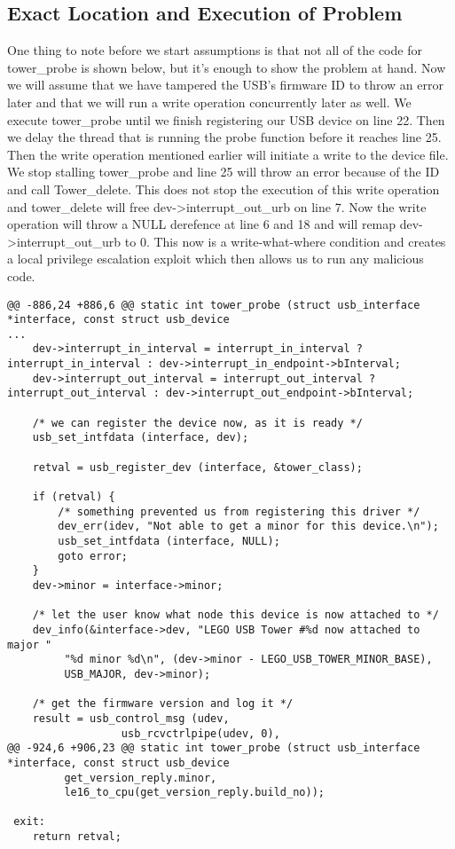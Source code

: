\documentclass{article}
\begin{document}
\subsection{Exact Location and Execution of Problem}
One thing to note before we start assumptions is that not all of the code for tower\_probe is shown below, but it's enough to show the problem at hand. Now we will assume that we have tampered the USB's firmware ID to throw an error later and that we will run a write operation concurrently later as well. We execute tower\_probe until we finish registering our USB device on line 22. Then we delay the thread that is running the probe function before it reaches line 25. Then the write operation mentioned earlier will initiate a write to the device file. We stop stalling tower\_probe and line 25 will throw an error because of the ID and call Tower\_delete. This does not stop the execution of this write operation and tower\_delete will free dev->interrupt\_out\_urb on line 7. Now the write operation will throw a NULL derefence at line 6 and 18 and will remap dev->interrupt\_out\_urb to 0. This now is a write-what-where condition and creates a local privilege escalation exploit which then allows us to run any malicious code.
\begin{lstlisting}[style=CStyle]
@@ -886,24 +886,6 @@ static int tower_probe (struct usb_interface *interface, const struct usb_device
...
 	dev->interrupt_in_interval = interrupt_in_interval ? interrupt_in_interval : dev->interrupt_in_endpoint->bInterval;
 	dev->interrupt_out_interval = interrupt_out_interval ? interrupt_out_interval : dev->interrupt_out_endpoint->bInterval;
 
	/* we can register the device now, as it is ready */
	usb_set_intfdata (interface, dev);

	retval = usb_register_dev (interface, &tower_class);

	if (retval) {
		/* something prevented us from registering this driver */
		dev_err(idev, "Not able to get a minor for this device.\n");
		usb_set_intfdata (interface, NULL);
		goto error;
	}
	dev->minor = interface->minor;

	/* let the user know what node this device is now attached to */
	dev_info(&interface->dev, "LEGO USB Tower #%d now attached to major "
		 "%d minor %d\n", (dev->minor - LEGO_USB_TOWER_MINOR_BASE),
		 USB_MAJOR, dev->minor);

 	/* get the firmware version and log it */
 	result = usb_control_msg (udev,
 				  usb_rcvctrlpipe(udev, 0),
@@ -924,6 +906,23 @@ static int tower_probe (struct usb_interface *interface, const struct usb_device
 		 get_version_reply.minor,
 		 le16_to_cpu(get_version_reply.build_no));
 
 exit:
 	return retval;
\end{lstlisting}
\end{document}
